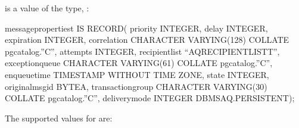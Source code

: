 \documentclass[letterpaper,10pt,english,openany,oneside]{sphinxmanual}
\begin{document}

 is a value of the type,
:

%
\begin{sphinxVerbatim}[commandchars=\\\{\}]
message\PYGZus{}properties\PYGZus{}t IS RECORD(
  priority INTEGER,
  delay INTEGER,
  expiration INTEGER,
  correlation CHARACTER VARYING(128) COLLATE pg\PYGZus{}catalog.”C”,
  attempts INTEGER,
  recipient\PYGZus{}list “AQ\PYGZdl{}\PYGZus{}RECIPIENT\PYGZus{}LIST\PYGZus{}T”,
  exception\PYGZus{}queue CHARACTER VARYING(61) COLLATE pg\PYGZus{}catalog.”C”,
  enqueue\PYGZus{}time TIMESTAMP WITHOUT TIME ZONE,
  state INTEGER,
  original\PYGZus{}msgid BYTEA,
  transaction\PYGZus{}group CHARACTER VARYING(30) COLLATE pg\PYGZus{}catalog.”C”,
  delivery\PYGZus{}mode INTEGER
DBMS\PYGZus{}AQ.PERSISTENT);
\end{sphinxVerbatim}

The supported values for  are:
\end{document}

